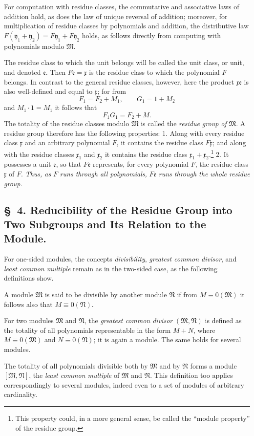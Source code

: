\documentclass[11pt]{article}
\newcommand{\mM}{\mathfrak{M}}
\newcommand{\mN}{\mathfrak{N}}
\newcommand{\mx}{\mathfrak{x}}
\newcommand{\my}{\mathfrak{y}}
\newcommand{\me}{\mathfrak{e}}
\begin{document}
For computation with residue classes, the commutative and associative laws of addition hold, as does the law of unique reversal of addition; moreover, for multiplication of residue classes by polynomials and addition, the distributive law $F(\my_1+\my_2)=F\my_1+F\my_2$ holds, as follows directly from computing with polynomials modulo $\mM$.

The residue class to which the unit belongs will be called the unit class, or unit, and denoted $\me$. Then $F\me=\mx$ is the residue class to which the polynomial $F$ belongs. In contrast to the general residue classes, however, here the product $\mx\me$ is also well-defined and equal to $\mx$; for from
\[
 F_1=F_2+M_1,\qquad G_1=1+M_2
\]
and $M_1\cdot1=M_1$ it follows that
\[
 F_1G_1=F_2+M.
\]
The totality of the residue classes modulo $\mM$ is called the \emph{residue group of} $\mM$. A residue group therefore has the following properties: 1. Along with every residue class $\mx$ and an arbitrary polynomial $F$, it contains the residue class $F\mx$; and along with the residue classes $\mx_1$ and $\mx_2$ it contains the residue class $\mx_1+\mx_2$.\footnote{This property could, in a more general sense, be called the ``module property'' of the residue group.} 2. It possesses a unit $\me$, so that $F\me$ represents, for every polynomial $F$, the residue class $\mx$ of $F$. \emph{Thus, as} $F$ \emph{runs through all polynomials,} $F\me$ \emph{runs through the whole residue group.}

\subsection*{\S~4. Reducibility of the Residue Group into Two Subgroups and Its Relation to the Module.}

For one-sided modules, the concepts \emph{divisibility}, \emph{greatest common divisor}, and \emph{least common multiple} remain as in the two-sided case, as the following definitions show.

A module $\mM$ is said to be divisible by another module $\mN$ if from $M\equiv0(\mM)$ it follows also that $M\equiv0(\mN)$.

For two modules $\mM$ and $\mN$, the \emph{greatest common divisor} $(\mM,\mN)$ is defined as the totality of all polynomials representable in the form $M+N$, where $M\equiv0(\mM)$ and $N\equiv0(\mN)$; it is again a module. The same holds for several modules.

The totality of all polynomials divisible both by $\mM$ and by $\mN$ forms a module $[\mM,\mN]$, the \emph{least common multiple} of $\mM$ and $\mN$. This definition too applies correspondingly to several modules, indeed even to a set of modules of arbitrary cardinality.
\end{document}
